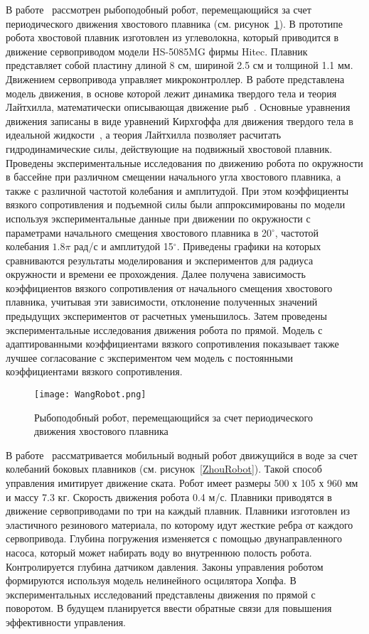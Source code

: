 В работе~\cite{Wang_Tan} рассмотрен рыбоподобный робот, перемещающийся за счет периодического движения хвостового плавника (см. рисунок~\ref{WangRobot}). В прототипе робота хвостовой плавник изготовлен из углеволокна, который приводится в движение сервоприводом модели HS-5085MG фирмы Hitec. Плавник представляет собой пластину длиной 8 см, шириной 2.5 см и толщиной 1.1 мм. Движением сервопривода управляет микроконтроллер. В работе представлена модель движения, в основе которой лежит  динамика твердого тела и теория Лайтхилла, математически описывающая движение рыб~\cite{Lighthill_1970}. Основные уравнения движения записаны в виде уравнений Кирхгоффа для движения твердого тела в идеальной жидкости~\cite{Kirchhoff}, а теория Лайтхилла позволяет расчитать гидродинамические силы, действующие на подвижный хвостовой плавник. Проведены экспериментальные исследования по движению робота по окружности в бассейне при различном смещении начального угла хвостового плавника, а также с различной частотой колебания и амплитудой. При этом коэффициенты вязкого сопротивления и подъемной силы были аппроксимированы по модели используя экспериментальные данные при движении по окружности с параметрами начального смещения хвостового плавника в 20$^\circ$, частотой колебания $1.8\pi$ рад/с и амплитудой 15$^\circ$. Приведены графики на которых сравниваются результаты моделирования и экспериментов для радиуса окружности и времени ее прохождения. Далее получена зависимость коэффициентов вязкого сопротивления от начального смещения хвостового плавника, учитывая эти зависимости, отклонение полученных значений предыдущих экспериментов от расчетных уменьшилось. Затем проведены экспериментальные исследования движения робота по прямой. Модель с адаптированными коэффициентами вязкого сопротивления показывает также лучшее согласование с экспериментом чем модель с постоянными коэффициентами вязкого сопротивления.

\begin{figure}[h]
	\centering
	\texttt{[image: WangRobot.png]}%
	\caption{Рыбоподобный робот, перемещающийся за счет периодического движения хвостового плавника}
	\label{WangRobot}
\end{figure}

В работе~\cite{Zhou_2011} рассматривается мобильный водный робот движущийся в воде за счет колебаний боковых плавников (см. рисунок~\ref{ZhouRobot}). Такой способ управления имитирует движение ската. Робот имеет размеры 500 х 105 х 960 мм и массу 7.3 кг. Скорость движения робота 0.4 м/с. Плавники приводятся в движение сервоприводами по три на каждый плавник. Плавники изготовлен из эластичного резинового материала, по которому идут жесткие ребра от каждого сервопривода. Глубина погружения изменяется с помощью двунаправленного насоса, который может набирать воду во внутреннюю полость робота. Контролируется глубина датчиком давления. Законы управления роботом формируются используя модель нелинейного осцилятора Хопфа. В экспериментальных исследований представлены движения по прямой с поворотом. В будущем планируется ввести обратные связи для повышения эффективности управления.

